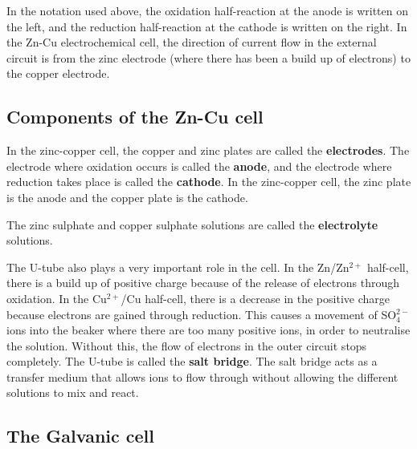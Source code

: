 In the notation used above, the oxidation half-reaction at the anode is written on the left, and the reduction half-reaction at the cathode is written on the right. In the Zn-Cu electrochemical cell, the direction of current flow in the external circuit is from the zinc electrode (where there has been a build up of electrons) to the copper electrode.
 
\subsection{Components of the Zn-Cu cell}

In the zinc-copper cell, the copper and zinc plates are called the \textbf{electrodes}. The electrode where oxidation occurs is called the \textbf{anode}, and the electrode where reduction takes place is called the \textbf{cathode}. In the zinc-copper cell, the zinc plate is the anode and the copper plate is the cathode.


The zinc sulphate and copper sulphate solutions are called the \textbf{electrolyte} solutions.


The U-tube also plays a very important role in the cell. In the Zn/Zn$^{2+}$ half-cell, there is a build up of positive charge because of the release of electrons through oxidation. In the Cu$^{2+}$/Cu half-cell, there is a decrease in the positive charge because electrons are gained through reduction. This causes a movement of SO$_{4}^{2-}$ ions into the beaker where there are too many positive ions, in order to neutralise the solution. Without this, the flow of electrons in the outer circuit stops completely. The U-tube is called the \textbf{salt bridge}. The salt bridge acts as a transfer medium that allows ions to flow through without allowing the different solutions to mix and react. 


\subsection{The Galvanic cell}

